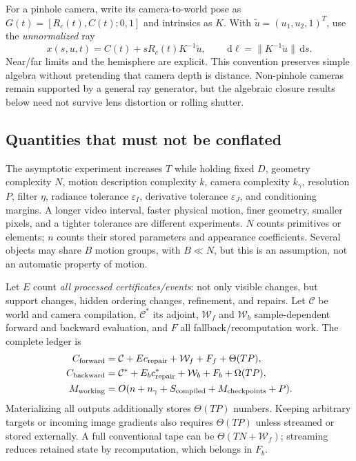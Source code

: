 \documentclass[10pt,letterpaper]{article}
\theoremstyle{remark}\newtheorem{counterexample}[proposition]{Counterexample}
\newcommand{\dd}{\,\mathrm d}
\newcommand{\eps}{\varepsilon}
\newcommand{\cost}{\mathcal C}
\newcommand{\work}{\mathcal W}
\begin{document}
For a pinhole camera, write its camera-to-world pose as $G(t)=[R_c(t),C(t);0,1]$ and intrinsics as $K$. With $\widetilde u=(u_1,u_2,1)^T$, use the \emph{unnormalized} ray
\begin{equation}
 x(s,u,t)=C(t)+sR_c(t)K^{-1}\widetilde u,\qquad
 \dd\ell=\|K^{-1}\widetilde u\|\dd s. \label{eq:ray}
\end{equation}
Near/far limits and the hemisphere are explicit. This convention preserves simple algebra without pretending that camera depth is distance. Non-pinhole cameras remain supported by a general ray generator, but the algebraic closure results below need not survive lens distortion or rolling shutter.

\subsection{Quantities that must not be conflated}
The asymptotic experiment increases $T$ while holding fixed $D$, geometry complexity $N$, motion description complexity $k$, camera complexity $k_\gamma$, resolution $P$, filter $\eta$, radiance tolerance $\eps_I$, derivative tolerance $\eps_J$, and conditioning margins. A longer video interval, faster physical motion, finer geometry, smaller pixels, and a tighter tolerance are different experiments. $N$ counts primitives or elements; $n$ counts their stored parameters and appearance coefficients. Several objects may share $B$ motion groups, with $B\ll N$, but this is an assumption, not an automatic property of motion.

Let $E$ count \emph{all processed certificates/events}: not only visible changes, but support changes, hidden ordering changes, refinement, and repairs. Let $\cost$ be world and camera compilation, $\cost^*$ its adjoint, $\work_f$ and $\work_b$ sample-dependent forward and backward evaluation, and $F$ all fallback/recomputation work. The complete ledger is
\begin{align}
 C_{\rm forward}&=\cost+E c_{\rm repair}+\work_f+F_f+\Theta(TP),\\
 C_{\rm backward}&=\cost^*+E_b c_{\rm repair}^*+\work_b+F_b+\Omega(TP), \label{eq:ledger}\\
 M_{\rm working}&=O(n+n_\gamma+S_{\rm compiled}+M_{\rm checkpoints}+P).
\end{align}
Materializing all outputs additionally stores $\Theta(TP)$ numbers. Keeping arbitrary targets or incoming image gradients also requires $\Theta(TP)$ unless streamed or stored externally. A full conventional tape can be $\Theta(TN+\work_f)$; streaming reduces retained state by recomputation, which belongs in $F_b$.
\end{document}
